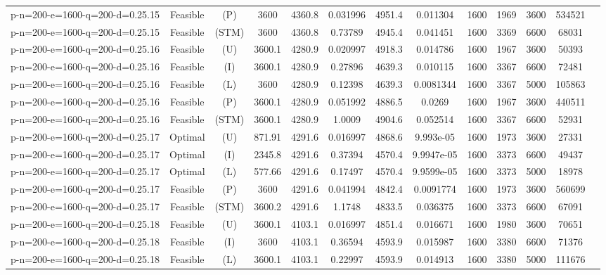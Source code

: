 \documentclass[landscape, a4paper]{article}
\newcommand{\STM}{\ensuremath{\mathrm{STM}}}
\newcommand{\Improved}{\ensuremath{\mathrm{I}}}
\newcommand{\Loose}{\ensuremath{\mathrm{L}}}
\newcommand{\Profit}{\ensuremath{\mathrm{P}}}
\newcommand{\Utility}{\ensuremath{\mathrm{U}}}
\begin{document}
\begin{center}
\begin{tabular}{lcccccccccccc}
p-n=200-e=1600-q=200-d=0.25.15 & Feasible & (\Profit) & 3600 & 4360.8 & 0.031996 & 4951.4 & 0.011304 & 1600 & 1969 & 3600 & 534521 & \\
p-n=200-e=1600-q=200-d=0.25.15 & Feasible & (\STM) & 3600 & 4360.8 & 0.73789 & 4945.4 & 0.041451 & 1600 & 3369 & 6600 & 68031 & \\
p-n=200-e=1600-q=200-d=0.25.16 & Feasible & (\Utility) & 3600.1 & 4280.9 & 0.020997 & 4918.3 & 0.014786 & 1600 & 1967 & 3600 & 50393 & \\
p-n=200-e=1600-q=200-d=0.25.16 & Feasible & (\Improved) & 3600.1 & 4280.9 & 0.27896 & 4639.3 & 0.010115 & 1600 & 3367 & 6600 & 72481 & \\
p-n=200-e=1600-q=200-d=0.25.16 & Feasible & (\Loose) & 3600 & 4280.9 & 0.12398 & 4639.3 & 0.0081344 & 1600 & 3367 & 5000 & 105863 & \\
p-n=200-e=1600-q=200-d=0.25.16 & Feasible & (\Profit) & 3600.1 & 4280.9 & 0.051992 & 4886.5 & 0.0269 & 1600 & 1967 & 3600 & 440511 & \\
p-n=200-e=1600-q=200-d=0.25.16 & Feasible & (\STM) & 3600.1 & 4280.9 & 1.0009 & 4904.6 & 0.052514 & 1600 & 3367 & 6600 & 52931 & \\
p-n=200-e=1600-q=200-d=0.25.17 & Optimal & (\Utility) & 871.91 & 4291.6 & 0.016997 & 4868.6 & 9.993e-05 & 1600 & 1973 & 3600 & 27331 & \\
p-n=200-e=1600-q=200-d=0.25.17 & Optimal & (\Improved) & 2345.8 & 4291.6 & 0.37394 & 4570.4 & 9.9947e-05 & 1600 & 3373 & 6600 & 49437 & \\
p-n=200-e=1600-q=200-d=0.25.17 & Optimal & (\Loose) & 577.66 & 4291.6 & 0.17497 & 4570.4 & 9.9599e-05 & 1600 & 3373 & 5000 & 18978 & \\
p-n=200-e=1600-q=200-d=0.25.17 & Feasible & (\Profit) & 3600 & 4291.6 & 0.041994 & 4842.4 & 0.0091774 & 1600 & 1973 & 3600 & 560699 & \\
p-n=200-e=1600-q=200-d=0.25.17 & Feasible & (\STM) & 3600.2 & 4291.6 & 1.1748 & 4833.5 & 0.036375 & 1600 & 3373 & 6600 & 67091 & \\
p-n=200-e=1600-q=200-d=0.25.18 & Feasible & (\Utility) & 3600.1 & 4103.1 & 0.016997 & 4851.4 & 0.016671 & 1600 & 1980 & 3600 & 70651 & \\
p-n=200-e=1600-q=200-d=0.25.18 & Feasible & (\Improved) & 3600 & 4103.1 & 0.36594 & 4593.9 & 0.015987 & 1600 & 3380 & 6600 & 71376 & \\
p-n=200-e=1600-q=200-d=0.25.18 & Feasible & (\Loose) & 3600.1 & 4103.1 & 0.22997 & 4593.9 & 0.014913 & 1600 & 3380 & 5000 & 111676 & \\

\end{tabular}
\end{center}
\end{document}
